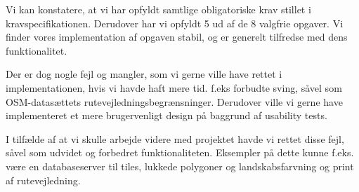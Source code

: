 Vi kan konstatere, at vi har opfyldt samtlige obligatoriske krav stillet i kravspecifikationen. Derudover har vi opfyldt 5 ud af de 8 valgfrie opgaver. Vi finder vores implementation af opgaven stabil, og er generelt tilfredse med dens funktionalitet.

Der er dog nogle fejl og mangler, som vi gerne ville have rettet i implementationen, hvis vi havde haft mere tid. f.eks forbudte sving, såvel som OSM-datasættets rutevejledningsbegrænsninger. Derudover ville vi gerne have implementeret et mere brugervenligt design på baggrund af usability tests. 

I tilfælde af at vi skulle arbejde videre med projektet havde vi rettet disse fejl, såvel som udvidet og forbedret funktionaliteten. Eksempler på dette kunne f.eks. være en databaseserver til tiles, lukkede polygoner og landskabsfarvning og print af rutevejledning.
